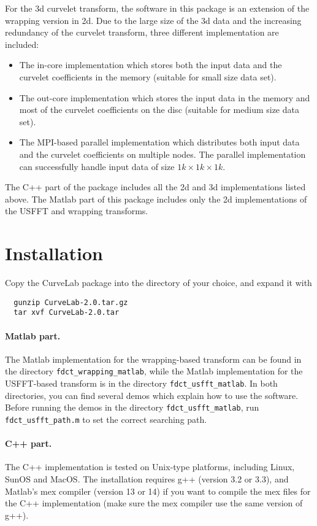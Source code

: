\documentclass[11pt]{article}
\begin{document}
For the 3d curvelet transform, the software in this package is an
extension of the wrapping version in 2d. Due to the large size of the
3d data and the increasing redundancy of the curvelet transform, three
different implementation are included:
\begin{itemize}
\item The in-core implementation which stores both the input data and
  the curvelet coefficients in the memory (suitable for small size data
  set).
\item The out-core implementation which stores the input data in the
  memory and most of the curvelet coefficients on the disc (suitable
  for medium size data set).
\item The MPI-based parallel implementation which distributes both
  input data and the curvelet coefficients on multiple nodes. The
  parallel implementation can successfully handle input data of size $1k
  \times 1k \times 1k$.
\end{itemize}

The C++ part of the package includes all the 2d and 3d implementations
listed above. The Matlab part of this package includes only the 2d
implementations of the USFFT and wrapping transforms.

\section{Installation}
Copy the CurveLab package into the directory of your choice, and 
expand it with
\begin{verbatim}
  gunzip CurveLab-2.0.tar.gz
  tar xvf CurveLab-2.0.tar
\end{verbatim}

\paragraph{Matlab part.} The Matlab implementation for the wrapping-based transform can be
found in the directory \verb=fdct_wrapping_matlab=, while the Matlab
implementation for the USFFT-based transform is in the directory
\verb=fdct_usfft_matlab=. In both directories, you can find several
demos which explain how to use the software. Before running the demos
in the directory \verb=fdct_usfft_matlab=, run
\verb=fdct_usfft_path.m= to set the correct searching path.

\paragraph{C++ part.} The C++ implementation is tested on Unix-type 
platforms, including Linux, SunOS and MacOS. The installation requires
g++ (version 3.2 or 3.3), and Matlab's mex compiler (version 13 or 14)
if you want to compile the mex files for the C++ implementation (make
sure the mex compiler use the same version of g++).
\end{document}
